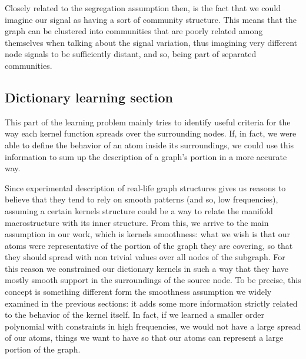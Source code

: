 Closely related to the segregation assumption then, is the fact that we could imagine our signal as having a sort of community structure. This means that the graph can be clustered into communities that are poorly related among themselves when talking about the signal variation, thus imagining very different node signals to be sufficiently distant, and so, being part of separated communities.


\subsection{Dictionary learning section}
This part of the learning problem mainly tries to identify useful criteria for the way each kernel function spreads over the surrounding nodes. If, in fact, we were able to define the behavior of an atom inside its surroundings, we could use this information to sum up the description of a graph's portion in a more accurate way.

Since experimental description of real-life graph structures gives us reasons to believe that they tend to rely on smooth patterns (and so, low frequencies), assuming a certain kernels structure could be a way to relate the manifold macrostructure with its inner structure. From this, we arrive to the main assumption in our work, which is kernels smoothness: what we wish is that our atoms were representative of the portion of the graph they are covering, so that they should spread with non trivial values over all nodes of the subgraph. For this reason we constrained our dictionary kernels in such a way that they have mostly smooth support in the surroundings of the source node. To  be precise, this concept is something different form the smoothness assumption we widely examined in the previous sections: it adds some more information strictly related to the behavior of the kernel itself. In fact, if we learned a smaller order polynomial with constraints in high frequencies, we would not have a large spread of our atoms, things we want to have so that our atoms can represent a large portion of the graph.

